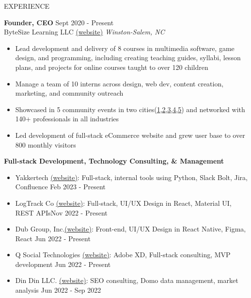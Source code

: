 \documentclass{resume} %
\begin{document}
\begin{rSection}{EXPERIENCE}

\textbf{Founder, CEO} \hfill Sept 2020 - Present\\
ByteSize Learning LLC \href{https://www.bytesizelearning.org/}{(website)} \hfill \textit{Winston-Salem, NC}
 \begin{itemize}
    \itemsep -3pt {} 
     \item Lead development and delivery of 8 courses in multimedia software, game design, and programming, including creating teaching guides, syllabi, lesson plans, and projects for online courses taught to over 120 children
     \item Manage a team of 10 interns across design, web dev, content creation, marketing, and community outreach
     \item Showcased in 5 community events in two cities(\href{https://www.youtube.com/watch?v=eWJ8lB9IxeY&t=2642s}{1},\href{https://www.youtube.com/watch?v=MBwIT_pzApw&t}{2},\href{https://ideascity.events.wfu.edu/}{3},\href{https://www.facebook.com/events/kaleideum-north/nc-science-festival-stem-innovation-expo/3122862374592766/}{4},\href{https://techdayhq.com/new-york/attending}{5}) and networked with 140+ professionals in all industries
     \item Led development of full-stack eCommerce website and grew user base to over 800 monthly visitors
 \end{itemize}

\textbf{Full-stack Development, Technology Consulting, \& Management}
 \begin{itemize}
    \itemsep -2pt {}
     \item Yakkertech \href{https://www.yakkertech.com/}{(website)}: Full-stack, internal tools using Python, Slack Bolt, Jira, Confluence \hfill Feb 2023 - Present
     \item LogTrack Co \href{https://www.thelogtrack.com/}{(website)}: Full-stack, UI/UX Design in React, Material UI, REST APIs\hfill Nov 2022 - Present
     \item Dub Group, Inc.\href{https://letswhirl.com/}{(website)}: Front-end, UI/UX Design in React Native, Figma, React \hfill Jun 2022 - Present
     \item Q Social Technologies \href{https://www.q-social.com/}{(website)}: Adobe XD, Full-stack consulting, MVP development \hfill Jun 2022 - Present
     \item Din Din LLC. \href{https://www.eatdindin.com/landing-page}{(website)}: SEO consulting, Domo data management, market analysis \hfill Jun 2022 - Sep 2022
 \end{itemize}

\end{rSection} 
\end{document}
